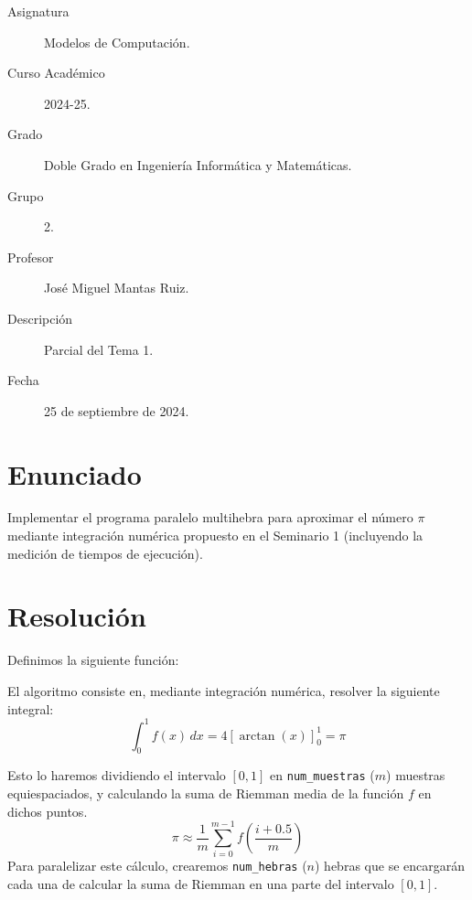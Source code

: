 \documentclass[12pt]{article}
\begin{document}

    
    

    \begin{description}
        \item[Asignatura] Modelos de Computación.
        \item[Curso Académico] 2024-25.
        \item[Grado] Doble Grado en Ingeniería Informática y Matemáticas.
        \item[Grupo] 2.
        \item[Profesor] José Miguel Mantas Ruiz.
        \item[Descripción] Parcial del Tema 1.
        \item[Fecha] 25 de septiembre de 2024.
    
    \end{description}
    \newpage
    
    
    \section{Enunciado}
    Implementar el programa paralelo multihebra para aproximar el número $\pi$ mediante integración numérica propuesto en el Seminario 1 (incluyendo la medición de tiempos de ejecución).

    \section{Resolución}
    Definimos la siguiente función:

    El algoritmo consiste en, mediante integración numérica, resolver la siguiente integral:
    \[
        \int_{0}^{1} f(x) \, dx = 4\left[\arctan(x)\right]_{0}^{1} = \pi
    \]

    Esto lo haremos dividiendo el intervalo $[0,1]$ en \verb|num_muestras| ($m$) muestras equiespaciados, y calculando la suma de Riemman media de la función $f$ en dichos puntos.
    \begin{equation*}
        \pi \approx \frac{1}{m} \sum_{i=0}^{m-1} f\left(\frac{i+0.5}{m}\right) 
    \end{equation*}
    Para paralelizar este cálculo, crearemos \verb|num_hebras| ($n$) hebras que se encargarán cada una de calcular la suma de Riemman en una parte del intervalo $[0,1]$.\\
\end{document}
